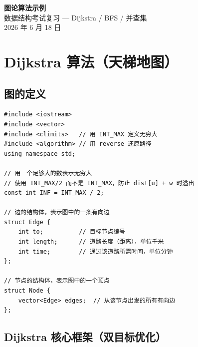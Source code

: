 \documentclass[12pt,a4paper]{article}
\begin{document}
\begin{center}
    {\Huge\bfseries 图论算法示例}\\[0.3cm]
    {\large 数据结构考试复习 --- Dijkstra / BFS / 并查集}\\[0.2cm]
    {2026 年 6 月 18 日}
\end{center}
\vspace{0.3cm}

\tableofcontents
\newpage

\section{Dijkstra 算法（天梯地图）}

\subsection{图的定义}

\begin{lstlisting}
#include <iostream>
#include <vector>
#include <climits>   // 用 INT_MAX 定义无穷大
#include <algorithm> // 用 reverse 还原路径
using namespace std;

// 用一个足够大的数表示无穷大
// 使用 INT_MAX/2 而不是 INT_MAX，防止 dist[u] + w 时溢出
const int INF = INT_MAX / 2;

// 边的结构体，表示图中的一条有向边
struct Edge {
    int to;          // 目标节点编号
    int length;      // 道路长度（距离），单位千米
    int time;        // 通过该道路所需时间，单位分钟
};

// 节点的结构体，表示图中的一个顶点
struct Node {
    vector<Edge> edges;  // 从该节点出发的所有有向边
};
\end{lstlisting}

\subsection{Dijkstra 核心框架（双目标优化）}
\end{document}
